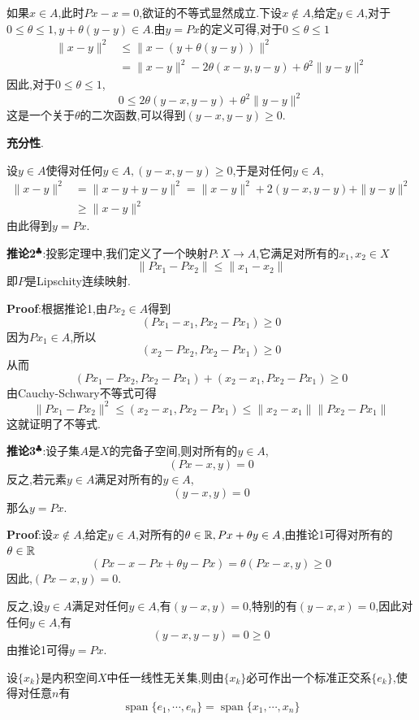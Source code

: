 如果$x\in A$,此时$Px-x=0$,欲证的不等式显然成立.下设$x\notin A$,给定$y\in A$,对于$0\leqslant\theta\leqslant 1,y+\theta(y-y)\in A$.由$y=Px$的定义可得,对于$0\leqslant\theta\leqslant 1$
$$
\begin{aligned}
    \|x-y\|^2& \leqslant \|x-(y+\theta(y-y))\|^2\\
             &= \|x-y\|^2-2\theta(x-y,y-y)+\theta ^2\|y-y\|^2
\end{aligned}
$$
因此,对于$0\leqslant\theta\leqslant 1$,
$$
0\leqslant 2\theta(y-x,y-y)+\theta ^2\|y-y\|^2
$$
这是一个关于$\theta$的二次函数,可以得到$(y-x,y-y)\geqslant 0$.\par
\textbf{充分性}.\par
设$y\in A$使得对任何$y\in A,(y-x,y-y)\geqslant 0$,于是对任何$y\in A$,
$$
\begin{aligned}
    \|x-y\|^2 &= \|x-y+y-y\|^2=\|x-y\|^2+2(y-x,y-y)+\|y-y\|^2\\
              &\geqslant \|x-y\|^2
\end{aligned}
$$
由此得到$y=Px$.\par
\textbf{推论2}$^\clubsuit $:投影定理中,我们定义了一个映射$P:X\to A$,它满足对所有的$x_1,x_2\in X$
$$
\|Px_1-Px_2\|\leqslant\|x_1-x_2\|
$$
即$P$是Lipschity连续映射.\par
\textbf{Proof}:根据推论1,由$Px_2\in A$得到
$$
(Px_1-x_1,Px_2-Px_1)\geqslant 0
$$
因为$Px_1\in A$,所以
$$
(x_2-Px_2,Px_2-Px_1)\geqslant 0
$$
从而
$$
(Px_1-Px_2,Px_2-Px_1)+(x_2-x_1,Px_2-Px_1)\geqslant 0
$$
由Cauchy-Schwary不等式可得
$$
\|Px_1-Px_2\|^2\leqslant (x_2-x_1,Px_2-Px_1)\leqslant \|x_2-x_1\|\|Px_2-Px_1\|
$$
这就证明了不等式.\par
\textbf{推论3}$^\clubsuit $:设子集$A$是$X$的完备子空间,则对所有的$y\in A$,
$$
(Px-x,y)=0
$$
反之,若元素$y\in A$满足对所有的$y\in A$,
$$
(y-x,y)=0
$$
那么$y=Px$.\par
\textbf{Proof}:设$x\notin A$,给定$y\in A$,对所有的$\theta\in\mathbb{R},Px+\theta y\in A$,由推论1可得对所有的$\theta\in\mathbb{R}$
$$
(Px-x-Px+\theta y-Px)=\theta(Px-x,y)\geqslant 0
$$
因此,$(Px-x,y)=0$.\par
反之,设$y\in A$满足对任何$y\in A$,有$(y-x,y)=0$,特别的有$(y-x,x)=0$,因此对任何$y\in A$,有
$$
(y-x,y-y)=0\geqslant 0
$$
由推论1可得$y=Px$.\par
\begin{tcolorbox}[colback=KuangNei,colframe=BianKuang,title=\textbf{Gram-Schmidt方法},sharpish corners]
    设$\{x_k\}$是内积空间$X$中任一线性无关集,则由$\{x_k\}$必可作出一个标准正交系$\{e_k\}$,使得对任意$n$有
    $$
    \operatorname{span}\{e_1,\cdots,e_n\}=\operatorname{span}\{x_1,\cdots,x_n\}
    $$
\end{tcolorbox}
